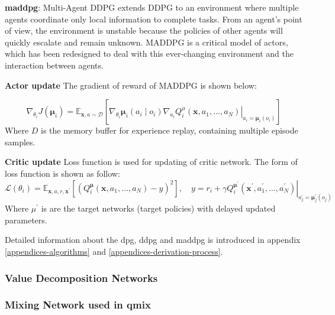 \textbf{\gls{maddpg}}: Multi-Agent DDPG\parencite{maddpg2017} extends DDPG to an environment where multiple agents coordinate only local information to complete tasks. From an agent's point of view, the environment is unstable because the policies of other agents will quickly escalate and remain unknown. MADDPG is a critical model of actors, which has been redesigned to deal with this ever-changing environment and the interaction between agents. 

\textbf{Actor update} The gradient of reward of MADDPG is shown below:

\begin{equation}
\nabla_{\theta_{i}} J\left(\boldsymbol{\mu}_{i}\right)=\mathbb{E}_{\mathbf{x}, a \sim \mathcal{D}}\left[\left.\nabla_{\theta_{i}} \boldsymbol{\mu}_{i}\left(a_{i} \mid o_{i}\right) \nabla_{a_{i}} Q_{i}^{\mu}\left(\mathbf{x}, a_{1}, \ldots, a_{N}\right)\right|_{a_{i}=\boldsymbol{\mu}_{i}\left(o_{i}\right)}\right]
\end{equation}
Where $D$ is the memory buffer for experience replay, containing multiple episode samples.

\textbf{Critic update} Loss function is used for updating of critic network. The form of loss function is shown as follow:
\begin{equation}
\mathcal{L}\left(\theta_{i}\right)=\mathbb{E}_{\mathbf{x}, a, r, \mathbf{x}^{\prime}}\left[\left(Q_{i}^{\boldsymbol{\mu}}\left(\mathbf{x}, a_{1}, \ldots, a_{N}\right)-y\right)^{2}\right], \quad y=r_{i}+\left.\gamma Q_{i}^{\boldsymbol{\mu}^{\prime}}\left(\mathbf{x}^{\prime}, a_{1}^{\prime}, \ldots, a_{N}^{\prime}\right)\right|_{a_{j}^{\prime}=\boldsymbol{\mu}_{j}^{\prime}\left(o_{j}\right)}
\end{equation}
Where $\mu^{\prime}$ is are the target networks (target policies) with delayed updated parameters.

Detailed information about the \gls{dpg}, \gls{ddpg} and \gls{maddpg} is introduced in appendix \ref{appendices-algorithms} and \ref{appendices-derivation-process}.

\subsubsection{Value Decomposition Networks}

\subsubsection{Mixing Network used in \gls{qmix}}

